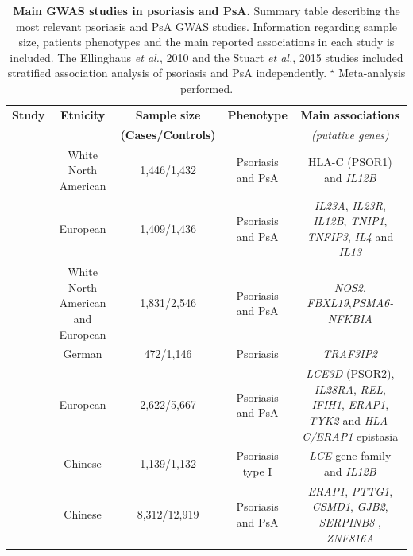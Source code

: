 %
\begin{landscape}
\begin{center}
\begin{longtable}[ht]{c c c c c}
\caption[Main GWAS studies in psoriasis and PsA]{\textbf{Main GWAS studies in psoriasis and PsA.} Summary table describing the most relevant psoriasis and PsA GWAS studies. Information regarding sample size, patients phenotypes and the main reported associations in each study is included. The Ellinghaus \textit{et al.}, 2010 and the Stuart \textit{et al.}, 2015 studies included stratified association analysis of psoriasis and PsA independently. $^\star$ Meta-analysis performed.}
\label{tab:GWAS_summary} \\
\toprule
\textbf{Study} & \textbf{Etnicity} & \textbf{Sample size}      & \textbf{Phenotype} & \textbf{Main associations} \\
               &                   & \textbf{(Cases/Controls)} &                    &  \textit{(putative genes)}                  \\
\midrule
\midrule
\parencite{Cargill2007} &	White North American &	1,446/1,432 &	Psoriasis and PsA &	HLA-C (PSOR1) and \textit{IL12B} \\
\parencite{Nair2009} &	European	& 1,409/1,436 &	Psoriasis and PsA &	\textit{IL23A}, \textit{IL23R}, \textit{IL12B}, \textit{TNIP1}, \textit{TNFIP3}, \textit{IL4} and \textit{IL13} \\
\parencite{Stuart2010} &	White North American and European &	1,831/2,546	& Psoriasis and PsA &	\textit{NOS2}, \textit{FBXL19},\textit{PSMA6-NFKBIA} \\

\parencite{Ellinghaus2010} &	German	& 472/1,146	& Psoriasis	& \textit{TRAF3IP2} \\

\parencite{Strange2010} &	European & 2,622/5,667 & Psoriasis and PsA & \textit{LCE3D} (PSOR2), \textit{IL28RA}, \textit{REL}, \textit{IFIH1}, \textit{ERAP1}, \textit{TYK2} and \textit{HLA-C/ERAP1} epistasia \\

\parencite{Zhang2008} & Chinese	& 1,139/1,132	& Psoriasis type I & \textit{LCE} gene family and \textit{IL12B} \\

\parencite{Sun2010} & Chinese	& 8,312/12,919	& Psoriasis and PsA &	\textit{ERAP1}, \textit{PTTG1}, \textit{CSMD1}, \textit{GJB2}, \textit{SERPINB8} , \textit{ZNF816A} \\


\end{longtable}
\end{center}
\end{landscape}
